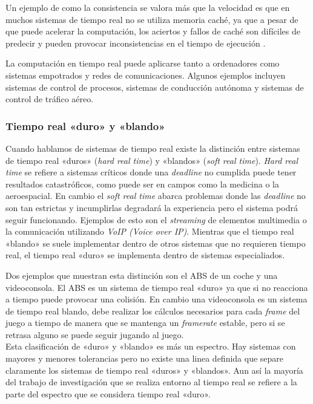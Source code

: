 Un ejemplo de como la consistencia se valora más que la velocidad es que en muchos sistemas de tiempo real no se utiliza memoria caché, ya que a pesar de que puede acelerar la computación, los aciertos y fallos de caché son difíciles de predecir y pueden provocar inconsistencias en el tiempo de ejecución \cite{MILLIGAN1996}.

La computación en tiempo real puede aplicarse tanto a ordenadores como sistemas empotrados y redes de comunicaciones. Algunos ejemplos incluyen sistemas de control de procesos, sistemas de conducción autónoma y sistemas de control de tráfico aéreo.

\subsubsection{Tiempo real «duro» y «blando»}
Cuando hablamos de sistemas de tiempo real existe la distinción entre sistemas de tiempo real «duros» (\textit{hard real time}) y «blandos» (\textit{soft real time}). \textit{Hard real time} se refiere a sistemas críticos donde una \textit{deadline} no cumplida puede tener resultados catastróficos, como puede ser en campos como la medicina o la aeroespacial. En cambio el \textit{soft real time} abarca problemas donde las \textit{deadline} no son tan estrictas y incumplirlas degradará la experiencia pero el sistema podrá seguir funcionando. Ejemplos de esto son el \textit{streaming} de elementos multimedia o la comunicación utilizando \textit{VoIP (Voice over IP)}. Mientras que el tiempo real «blando» se suele implementar dentro de otros sistemas que no requieren tiempo real, el tiempo real «duro» se implementa dentro de sistemas especialiados.

Dos ejemplos que muestran esta distinción son el ABS de un coche y una videoconsola. El ABS es un sistema de tiempo real «duro» ya que si no reacciona a tiempo puede provocar una colisión. En cambio una videoconsola es un sistema de tiempo real blando, debe realizar los cálculos necesarios para cada \textit{frame} del juego a tiempo de manera que se mantenga un \textit{framerate} estable, pero si se retrasa alguno se puede seguir jugando al juego.\\

Esta clasificación de «duro» y «blando» es más un espectro. Hay sistemas con mayores y menores tolerancias pero no existe una linea definida que separe claramente los sistemas de tiempo real «duros» y «blandos». Aun así la mayoría del trabajo de investigación que se realiza entorno al tiempo real se refiere a la parte del espectro que se considera tiempo real «duro».

